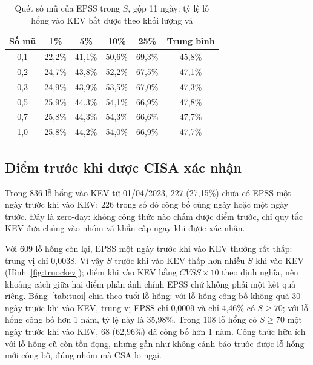 \documentclass[conference]{IEEEtran}
\begin{document}
\begin{table}[htbp]
\caption{Quét số mũ của EPSS trong $S$, gộp 11 ngày: tỷ lệ lỗ hổng vào KEV bắt được theo khối lượng vá}\label{tab:somu}
\centering
\setlength{\tabcolsep}{4pt}
\begin{tabular}{cccccc}
\toprule
Số mũ & 1\% & 5\% & 10\% & 25\% & Trung bình \\
\midrule
0,1 & 22,2\% & 41,1\% & 50,6\% & 69,3\% & 45,8\% \\
0,2 & 24,7\% & 43,8\% & 52,2\% & 67,5\% & 47,1\% \\
0,3 & 24,9\% & 43,9\% & 53,5\% & 67,0\% & 47,3\% \\
0,5 & 25,9\% & 44,3\% & 54,1\% & 66,9\% & 47,8\% \\
0,7 & 25,8\% & 44,3\% & 54,3\% & 66,6\% & 47,7\% \\
1,0 & 25,8\% & 44,2\% & 54,0\% & 66,9\% & 47,7\% \\
\bottomrule
\end{tabular}
\end{table}

\subsection{Điểm trước khi được CISA xác nhận}
Trong 836 lỗ hổng vào KEV từ 01/04/2023, 227 (27,15\%) chưa có EPSS một ngày trước khi vào KEV;
226 trong số đó công bố cùng ngày hoặc một ngày trước. Đây là zero-day: không công thức nào chấm
được điểm trước, chỉ quy tắc KEV đưa chúng vào nhóm vá khẩn cấp ngay khi được xác nhận.

Với 609 lỗ hổng còn lại, EPSS một ngày trước khi vào KEV thường rất thấp: trung vị chỉ 0,0038. Vì
vậy $S$ trước khi vào KEV thấp hơn nhiều $S$ khi vào KEV (Hình~\ref{fig:truockev}); điểm khi vào
KEV bằng $\mathit{CVSS} \times 10$ theo định nghĩa, nên khoảng cách giữa hai điểm phản ánh chính
EPSS chứ không phải một kết quả riêng. Bảng~\ref{tab:tuoi} chia theo tuổi lỗ hổng: với lỗ hổng công bố không quá 30 ngày trước khi vào KEV, trung vị EPSS chỉ 0,0009 và chỉ 4,46\% có $S \ge 70$;
với lỗ hổng công bố hơn 1 năm, tỷ lệ này là 35,98\%. Trong 108 lỗ hổng có $S \ge 70$ một ngày
trước khi vào KEV, 68 (62,96\%) đã công bố hơn 1 năm. Công thức hữu ích với lỗ hổng cũ còn tồn
đọng, nhưng gần như không cảnh báo trước được lỗ hổng mới công bố, đúng nhóm mà CSA lo ngại.
\end{document}
